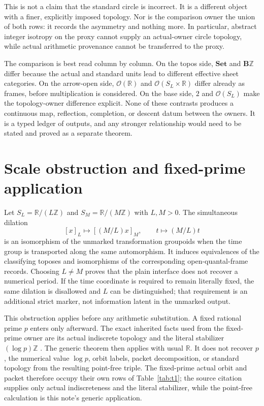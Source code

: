 \documentclass[12pt]{article}
\theoremstyle{definition}
\newcommand{\B}{\mathbf B}
\newcommand{\Ocal}{\mathcal O}
\newcommand{\R}{\mathbb R}
\newcommand{\Z}{\mathbb Z}
\newcommand{\Set}{\mathbf{Set}}
\begin{document}
This is not a claim that the standard circle is incorrect.  It is a different object with a finer, explicitly imposed topology.  Nor is the comparison owner the union of both rows: it records the asymmetry and nothing more.  In particular, abstract integer isotropy on the proxy cannot supply an actual-owner circle topology, while actual arithmetic provenance cannot be transferred to the proxy.

The comparison is best read column by column.  On the topos side, $\Set$ and $\B\Z$ differ because the actual and standard units lead to different effective sheet categories.  On the arrow-open side, $\Ocal(\R)$ and $\Ocal(S_L\times\R)$ differ already as frames, before multiplication is considered.  On the base side, $2$ and $\Ocal(S_L)$ make the topology-owner difference explicit.  None of these contrasts produces a continuous map, reflection, completion, or descent datum between the owners.  It is a typed ledger of outputs, and any stronger relationship would need to be stated and proved as a separate theorem.

\section{Scale obstruction and fixed-prime application}

Let $S_L=\R/(L\Z)$ and $S_M=\R/(M\Z)$ with $L,M>0$.  The simultaneous dilation
\[
 [x]_L\longmapsto[(M/L)x]_M,\qquad
 t\longmapsto(M/L)t
\]
is an isomorphism of the unmarked transformation groupoids when the time group is transported along the same automorphism.  It induces equivalences of the classifying toposes and isomorphisms of the corresponding open-quantal-frame records.  Choosing $L\ne M$ proves that the plain interface does not recover a numerical period.  If the time coordinate is required to remain literally fixed, the same dilation is disallowed and $L$ can be distinguished; that requirement is an additional strict marker, not information latent in the unmarked output.

This obstruction applies before any arithmetic substitution.  A fixed rational prime $p$ enters only afterward.  The exact inherited facts used from the fixed-prime owner are its actual indiscrete topology and the literal stabilizer $(\log p)\Z$ \cite[lines~409--426]{wang2026packets}.  The generic theorem then applies with usual $\R$.  It does not recover $p$, the numerical value $\log p$, orbit labels, packet decomposition, or standard topology from the resulting point-free triple.
The fixed-prime actual orbit and packet therefore occupy their own rows of Table~\ref{tab:t1}; the source citation supplies only actual indiscreteness and the literal stabilizer, while the point-free calculation is this note's generic application.
\end{document}
